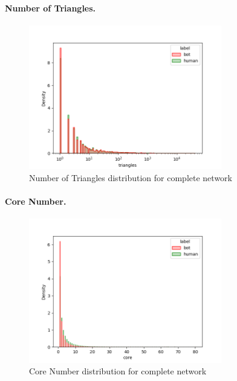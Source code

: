 \documentclass[12pt, a4paper]{article}
\begin{document}
        \paragraph{Number of Triangles.}
        \begin{figure}[H]
        	\centering
            \includegraphics[width=0.75\textwidth]{complete_triangles.png}
            \caption{Number of Triangles distribution for complete network}
        \end{figure}
		\paragraph{Core Number.}
		\begin{figure}[H]
        	\centering
            \includegraphics[width=0.75\textwidth]{complete_core.png}
            \caption{Core Number distribution for complete network}
        \end{figure}
\end{document}
